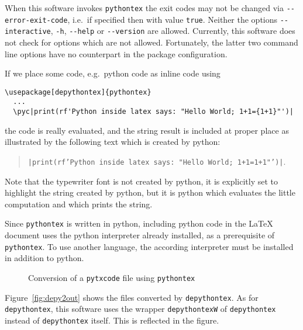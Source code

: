 When this software invokes \texttt{pythontex} 
the exit codes may not be changed via \texttt{-{}-error-exit-code}, 
i.e.~if specified then with value \texttt{true}. 
Neither the options \texttt{-{}-interactive}, \texttt{-h}, \texttt{-{}-help} or \texttt{-{}-version} are allowed. 
Currently, this software does not check for options which are not allowed. 
Fortunately, the latter two command line options have no counterpart in the package configuration. 




If we place some code, e.g.~python code as inline code using 
%
\begin{lstlisting}[basicstyle=\footnotesize]
  \usepackage[depythontex]{pythontex}
  ...
  \pyc|print(rf'Python inside latex says: "Hello World; 1+1={1+1}"')|
\end{lstlisting}
%
the code is really evaluated, and the string result is included at proper place 
as illustrated by the following text which is created by python: 
%
\begin{quote}
  \texttt{\pyc|print(rf'Python inside latex says: "Hello World; 1+1={1+1}"')|}. %
\end{quote}
%
Note that the typewriter font is not created by python, 
it is explicitly set to highlight the string created by python, 
but it is python which evaluates the little computation 
and which prints the string. 

Since \texttt{pythontex} is written in python, 
including python code in the \LaTeX{} document 
uses the python interpreter already installed, as a prerequisite of \texttt{pythontex}. 
To use another language, the according interpreter must be installed in addition to python. 







\begin{figure}[!htb]
  \centering
  \caption{\label{fig:py2dir}Conversion of a \texttt{pytxcode} file using \texttt{pythontex}}
  \end{figure}


  Figure~\ref{fig:depy2out} shows the files converted by \texttt{depythontex}. 
  As for \texttt{depythontex}, this software uses the wrapper \texttt{depythontexW} 
  of \texttt{depythontex} instead of \texttt{depythontex} itself. 
  This is reflected in the figure. 


